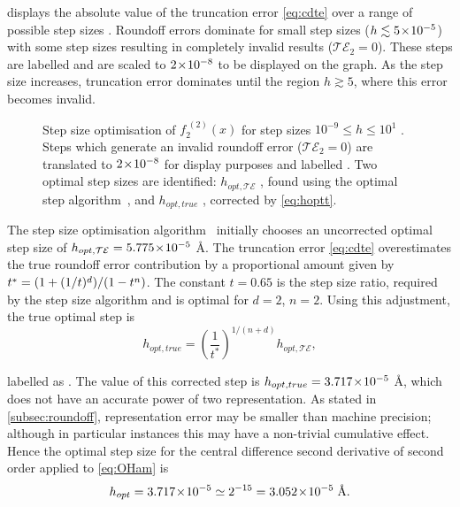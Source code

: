  displays the absolute value of the truncation error \cref{eq:cdte} over a range of possible step sizes .
Roundoff errors dominate for small step sizes ($h \lesssim 5\!\times\!10^{-5}$) with some step sizes resulting in completely invalid results (\ie $\mathcal{TE}_2 = 0$).
These steps are labelled  and are scaled to $2\!\times\!10^{-8}$ to be displayed on the graph.
As the step size increases, truncation error dominates until the region $h \gtrsim 5$, where this error becomes invalid.
\begin{figure}[htp]
\centering
\resizebox{\textwidth}{!}{}
\caption[Step size optimisation of $f_2^{\;(2)}(x)$]{\label{fig:hopt3pt}Step size optimisation of $f_2^{\;(2)}(x)$ for step sizes $10^{-9}\!\leq\! h\! \leq\! 10^1$ . Steps which generate an invalid roundoff error (\ie $\mathcal{TE}_2 = 0$) are translated to $2\!\times\!10^{-8}$ for display purposes and labelled . Two optimal step sizes are identified: $h_{opt,\mathcal{TE}}$ , found using the optimal step algorithm~\cite{Mathur2012}, and $h_{opt,true}$ , corrected by \cref{eq:hoptt}.}
\end{figure}

The step size optimisation algorithm~\cite{Mathur2012} initially chooses an uncorrected optimal step size  of $h_{opt,\mathcal{TE}} = 5.775\!\times\!10^{-5}$ Å.
The truncation error \cref{eq:cdte} overestimates the true roundoff error contribution by a proportional amount given by $\cramped{t^* = (1+(1/t)^d)/(1-t^n)}$.
The constant $t = 0.65$ is the step size ratio, required by the step size algorithm and is optimal for $d=2$, $n=2$.
Using this adjustment, the true optimal step is
\begin{equation}
h_{opt,true} = \left(\frac{1}{t^*}\right)^{1/(n+d)}h_{opt,\mathcal{TE}},\label{eq:hoptt}
\end{equation}

labelled as .
The value of this corrected step is $h_{opt,true} = 3.717\!\times\!10^{-5}$ Å, which does not have an accurate power of two representation.
As stated in \cref{subsec:roundoff}, representation error may be smaller than machine precision; although in particular instances this may have a non-trivial cumulative effect.
Hence the optimal step size for the central difference second derivative of second order applied to \cref{eq:OHam} is
\begin{equation}
h_{opt} = 3.717\!\times\!10^{-5} \simeq 2^{-15} = 3.052\!\times\!10^{-5}\;\text{Å}.
\end{equation}

